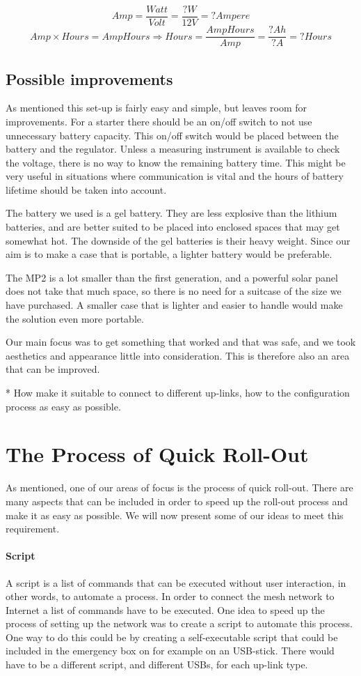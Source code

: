 $$Amp = \frac{Watt}{Volt} = \frac{? W}{12 V} = ? Ampere$$
$$Amp\times Hours = AmpHours \Rightarrow Hours = \frac{AmpHours}{Amp} = \frac{? Ah}{? A} = ? Hours$$


\subsection{Possible improvements }
As mentioned this set-up is fairly easy and simple, but leaves room for improvements. For a starter there should be an on/off switch to not use unnecessary battery capacity. This on/off switch would be placed between the battery and the regulator. Unless a measuring instrument is available to check the voltage, there is no way to know the remaining battery time. This might be very useful in situations where communication is vital and the hours of battery lifetime should be taken into account.

The battery we used is a gel battery. They are less explosive than the lithium batteries, and are better suited to be placed into enclosed spaces that may get somewhat hot. The downside of the gel batteries is their heavy weight. Since our aim is to make a case that is portable, a lighter battery would be preferable. 

The MP2 is a lot smaller than the first generation, and a powerful solar panel does not take that much space, so there is no need for a suitcase of the size we have purchased. A smaller case that is lighter and easier to handle would make the solution even more portable. 

Our main focus was to get something that worked and that was safe, and we took aesthetics and appearance little into consideration. This is therefore also an area that can be improved. 

* How make it suitable to connect to different up-links, how to the configuration process as easy as possible. 

\section{The Process of Quick Roll-Out}
As mentioned, one of our areas of focus is the process of quick roll-out. There are many aspects that can be included in order to speed up the roll-out process and make it as easy as possible. We will now present some of our ideas to meet this requirement.

\paragraph{Script}
A script is a list of commands that can be executed without user interaction, in other words, to automate a process. In order to connect the mesh network to Internet a list of commands have to be executed. One idea to speed up the process of setting up the network was to create a script to automate this process. One way to do this could be by creating a self-executable script that could be included in the emergency box on for example on an USB-stick. There would have to be a different script, and different USBs, for each up-link type. 

